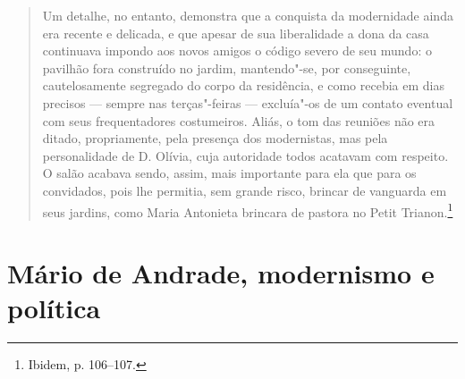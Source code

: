 


\begin{quote}
Um detalhe, no entanto, demonstra que a conquista da modernidade ainda
era recente e delicada, e que apesar de sua liberalidade a dona da casa
continuava impondo aos novos amigos o código severo de seu mundo: o
pavilhão fora construído no jardim, mantendo"-se, por conseguinte,
cautelosamente segregado do corpo da residência, e como recebia em dias
precisos --- sempre nas terças"-feiras --- excluía"-os de um contato
eventual com seus frequentadores costumeiros. Aliás, o tom das reuniões
não era ditado, propriamente, pela presença dos modernistas, mas pela
personalidade de D. Olívia, cuja autoridade todos acatavam com respeito.
O salão acabava sendo, assim, mais importante para ela que para os
convidados, pois lhe permitia, sem grande risco, brincar de vanguarda em
seus jardins, como Maria Antonieta brincara de pastora no Petit
Trianon.\footnote{Ibidem, p. 106--107.}
\end{quote}

\section*{Mário de Andrade, modernismo e política}

